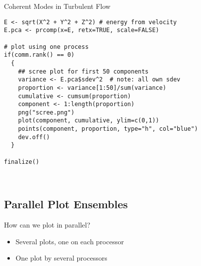 \begin{frame}
  \begin{exampleblock}{Coherent Modes in Turbulent Flow}\pause
\begin{lstlisting}[title=Compute PCA and do Scree Plot (e0\_pca.r)]
E <- sqrt(X^2 + Y^2 + Z^2) # energy from velocity
E.pca <- prcomp(x=E, retx=TRUE, scale=FALSE) 

# plot using one process
if(comm.rank() == 0)
  {
    ## scree plot for first 50 components
    variance <- E.pca$sdev^2  # note: all own sdev
    proportion <- variance[1:50]/sum(variance)
    cumulative <- cumsum(proportion)
    component <- 1:length(proportion)
    png("scree.png")
    plot(component, cumulative, ylim=c(0,1))
    points(component, proportion, type="h", col="blue")
    dev.off()
  }

finalize()
        
        

\end{lstlisting} %
  \end{exampleblock}
\end{frame}






\subsection{Parallel Plot Ensembles}

\begin{frame}
  \begin{block}{How can we plot in parallel?}\pause
  \begin{itemize}
    \item Several plots, one on each processor
    \item One plot by several processors
  \end{itemize}
  \end{block}
\end{frame}


